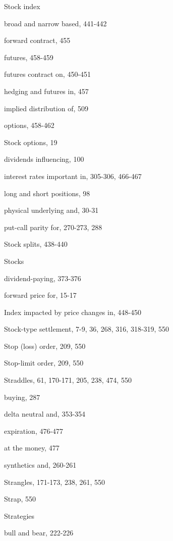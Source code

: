 \noindent Stock index\par
\noindent broad and narrow based, 441-442\par
\noindent forward contract, 455\par
\noindent futures, 458-459\par
\noindent futures contract on, 450-451\par
\noindent hedging and futures in, 457\par
\noindent implied distribution of, 509\par
\noindent options, 458-462\par
\noindent Stock options, 19\par
\noindent dividends influencing, 100\par
\noindent interest rates important in, 305-306, 466-467\par
\noindent long and short positions, 98\par
\noindent physical underlying and, 30-31\par
\noindent put-call parity for, 270-273, 288\par
\noindent Stock splits, 438-440\par
\noindent Stocks\par
\noindent dividend-paying, 373-376\par
\noindent forward price for, 15-17\par
\noindent Index impacted by price changes in, 448-450\par
\noindent Stock-type settlement, 7-9, 36, 268, 316, 318-319, 550\par
\noindent Stop (loss) order, 209, 550\par
\noindent Stop-limit order, 209, 550\par
\noindent Straddles, 61, 170-171, 205, 238, 474, 550\par
\noindent buying, 287\par
\noindent delta neutral and, 353-354\par
\noindent expiration, 476-477\par
\noindent at the money, 477\par
\noindent synthetics and, 260-261\par
\noindent Strangles, 171-173, 238, 261, 550\par
\noindent Strap, 550\par
\noindent Strategies\par
\noindent bull and bear, 222-226\par

